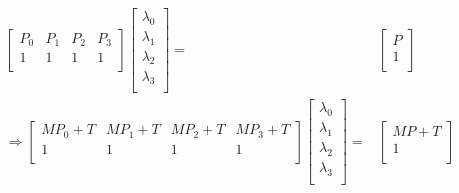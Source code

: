 \[\begin{aligned}
\begin{bmatrix}
	P_0&P_1&P_2&P_3\\
	1&1&1&1\\
\end{bmatrix}
\begin{bmatrix}
	\lambda_0\\\lambda_1\\\lambda_2\\\lambda_3\\
\end{bmatrix}
	=&
\begin{bmatrix}
	P\\1\\
\end{bmatrix}
\\
\Rightarrow
\begin{bmatrix}
	MP_0+T&MP_1+T&MP_2+T&MP_3+T\\
	1&1&1&1\\
\end{bmatrix}
\begin{bmatrix}
	\lambda_0\\\lambda_1\\\lambda_2\\\lambda_3\\
\end{bmatrix}
	=&
\begin{bmatrix}
	MP+T\\1\\
\end{bmatrix}
\end{aligned}\]



%
